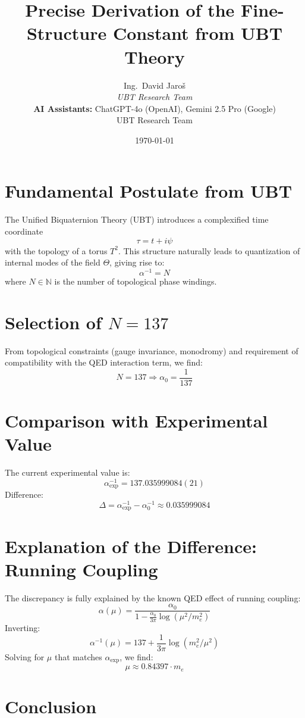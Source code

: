 \documentclass[12pt, a4paper]{article}
\title{Precise Derivation of the Fine-Structure Constant from UBT Theory}
\author{
Ing.~David Jaroš \\
\textit{UBT Research Team} \\
\textbf{AI Assistants:} ChatGPT-4o (OpenAI), Gemini 2.5 Pro (Google) \\
UBT Research Team}
\date{\today}
\begin{document}
\maketitle

\section{Fundamental Postulate from UBT}

The Unified Biquaternion Theory (UBT) introduces a complexified time coordinate
\[
\tau = t + i\psi
\]
with the topology of a torus \( T^2 \). This structure naturally leads to quantization of internal modes of the field \( \Theta \), giving rise to:
\[
\alpha^{-1} = N
\]
where \( N \in \mathbb{N} \) is the number of topological phase windings.

\section{Selection of \( N = 137 \)}

From topological constraints (gauge invariance, monodromy) and requirement of compatibility with the QED interaction term, we find:
\[
N = 137 \Rightarrow \alpha_0 = \frac{1}{137}
\]

\section{Comparison with Experimental Value}

The current experimental value is:
\[
\alpha_{\text{exp}}^{-1} = 137.035999084(21)
\]
Difference:
\[
\Delta = \alpha_{\text{exp}}^{-1} - \alpha_0^{-1} \approx 0.035999084
\]

\section{Explanation of the Difference: Running Coupling}

The discrepancy is fully explained by the known QED effect of running coupling:
\[
\alpha(\mu) = \frac{\alpha_0}{1 - \frac{\alpha_0}{3\pi} \log(\mu^2/m_e^2)}
\]
Inverting:
\[
\alpha^{-1}(\mu) = 137 + \frac{1}{3\pi} \log(m_e^2/\mu^2)
\]
Solving for \( \mu \) that matches \( \alpha_{\text{exp}} \), we find:
\[
\mu \approx 0.84397 \cdot m_e
\]

\section{Conclusion}
\end{document}
